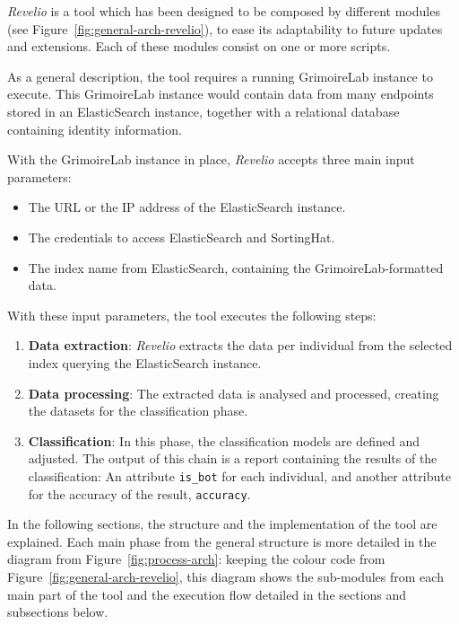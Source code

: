 \documentclass[a4paper, 12pt]{book}
\begin{document}
\emph{Revelio} is a tool which has been designed to be composed by different modules (see Figure~\ref{fig:general-arch-revelio}), to ease its adaptability to future updates and extensions. Each
of these modules consist on one or more scripts.

As a general description, the tool requires a running GrimoireLab instance to execute. This GrimoireLab instance would contain data from many endpoints stored in an ElasticSearch instance, together with a relational database containing identity information.

With the GrimoireLab instance in place, \emph{Revelio} accepts three main input parameters:
\begin{itemize}
    \item The URL or the IP address of the ElasticSearch instance.
    \item The credentials to access ElasticSearch and SortingHat.
    \item The index name from ElasticSearch, containing the GrimoireLab-formatted data.
\end{itemize}

With these input parameters, the tool executes the following steps:

\begin{enumerate}
    \item \textbf{Data extraction}: \emph{Revelio} extracts the data
    per individual from the selected index querying the
    ElasticSearch instance.
    \item \textbf{Data processing}: The extracted data is analysed
    and processed, creating the datasets for the classification
    phase.
    \item \textbf{Classification}: In this phase, the classification
    models are defined and adjusted. The output of this chain is a
    report containing the results of the classification: An
    attribute \texttt{is\_bot} for each individual, and
    another attribute for the accuracy of the result, \texttt{accuracy}.
\end{enumerate}

In the following sections, the structure and the implementation of the tool are explained. Each main phase from the general structure is more detailed in the diagram from Figure~\ref{fig:process-arch}: keeping the colour code from Figure~\ref{fig:general-arch-revelio}, this diagram shows the sub-modules from each main part of the tool and the execution flow detailed in the sections and subsections below.
\end{document}
